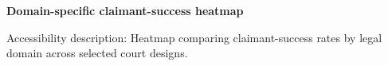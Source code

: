 \documentclass[11pt]{article}
\begin{document}
\noindent\textbf{Domain-specific claimant-success heatmap}\par
\smallskip
\noindent
\par\smallskip
\noindent\footnotesize Accessibility description: Heatmap comparing claimant-success rates by legal domain across selected court designs.
\end{document}
